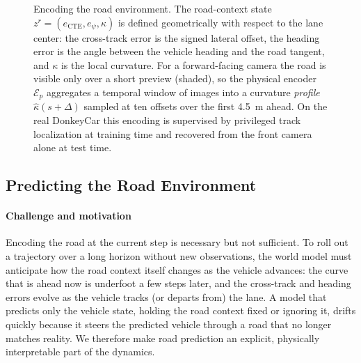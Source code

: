 \documentclass[preprint,12pt]{elsarticle}
\newcommand{\zr}{z^{r}}      %
\begin{document}
\begin{figure}[t]
{}
    \caption{Encoding the road environment. The road-context state
    $\zr=(e_{\mathrm{CTE}}, e_\psi, \kappa)$ is defined geometrically with
    respect to the lane center: the cross-track error is the signed lateral
    offset, the heading error is the angle between the vehicle heading and the
    road tangent, and $\kappa$ is the local curvature. For a forward-facing
    camera the road is visible only over a short preview (shaded), so the
    physical encoder $\mathcal{E}_p$ aggregates a temporal window of images into
    a curvature \emph{profile} $\hat{\kappa}(s+\Delta)$ sampled at ten offsets
    over the first \SI{4.5}{m} ahead. On the real DonkeyCar this encoding is
    supervised by privileged track localization at training time and recovered
    from the front camera alone at test time.}
    \label{fig:encoding}
\end{figure}

\subsection{Predicting the Road Environment}\label{sec:prediction}  %

\paragraph{Challenge and motivation}
Encoding the road at the current step is necessary but not sufficient.
To roll out a trajectory over a long horizon without new observations, the world
model must anticipate how the road context itself changes as the vehicle advances:
the curve that is ahead now is underfoot a few steps later, and the cross-track
and heading errors evolve as the vehicle tracks (or departs from) the lane.
A model that predicts only the vehicle state, holding the road context fixed or
ignoring it, drifts quickly because it steers the predicted vehicle through a road
that no longer matches reality.
We therefore make road prediction an explicit, physically interpretable part of
the dynamics.
\end{document}
